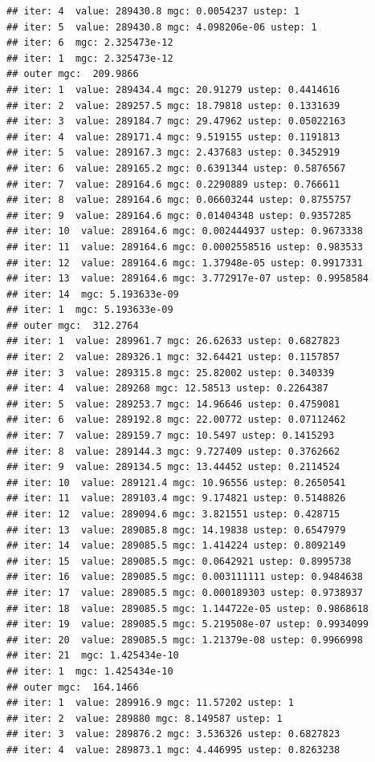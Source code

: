 \documentclass{article}\usepackage[]{graphicx}\usepackage[]{xcolor}
\makeatletter
\newenvironment{kframe}{%
 \def\at@end@of@kframe{}%
 \ifinner\ifhmode%
  \def\at@end@of@kframe{\end{minipage}}%
  \begin{minipage}{\columnwidth}%
 \fi\fi%
 \def\FrameCommand##1{\hskip\@totalleftmargin \hskip-\fboxsep
 \colorbox{shadecolor}{##1}\hskip-\fboxsep
     \hskip-\linewidth \hskip-\@totalleftmargin \hskip\columnwidth}%
 \MakeFramed {\advance\hsize-\width
   \@totalleftmargin\z@ \linewidth\hsize
   \@setminipage}}%
 {\par\unskip\endMakeFramed%
 \at@end@of@kframe}
\newenvironment{knitrout}{}{} %
\makeatother
\begin{document}
\begin{knitrout}
\begin{kframe}
\begin{verbatim}
## iter: 4  value: 289430.8 mgc: 0.0054237 ustep: 1 
## iter: 5  value: 289430.8 mgc: 4.098206e-06 ustep: 1 
## iter: 6  mgc: 2.325473e-12 
## iter: 1  mgc: 2.325473e-12 
## outer mgc:  209.9866 
## iter: 1  value: 289434.4 mgc: 20.91279 ustep: 0.4414616 
## iter: 2  value: 289257.5 mgc: 18.79818 ustep: 0.1331639 
## iter: 3  value: 289184.7 mgc: 29.47962 ustep: 0.05022163 
## iter: 4  value: 289171.4 mgc: 9.519155 ustep: 0.1191813 
## iter: 5  value: 289167.3 mgc: 2.437683 ustep: 0.3452919 
## iter: 6  value: 289165.2 mgc: 0.6391344 ustep: 0.5876567 
## iter: 7  value: 289164.6 mgc: 0.2290889 ustep: 0.766611 
## iter: 8  value: 289164.6 mgc: 0.06603244 ustep: 0.8755757 
## iter: 9  value: 289164.6 mgc: 0.01404348 ustep: 0.9357285 
## iter: 10  value: 289164.6 mgc: 0.002444937 ustep: 0.9673338 
## iter: 11  value: 289164.6 mgc: 0.0002558516 ustep: 0.983533 
## iter: 12  value: 289164.6 mgc: 1.37948e-05 ustep: 0.9917331 
## iter: 13  value: 289164.6 mgc: 3.772917e-07 ustep: 0.9958584 
## iter: 14  mgc: 5.193633e-09 
## iter: 1  mgc: 5.193633e-09 
## outer mgc:  312.2764 
## iter: 1  value: 289961.7 mgc: 26.62633 ustep: 0.6827823 
## iter: 2  value: 289326.1 mgc: 32.64421 ustep: 0.1157857 
## iter: 3  value: 289315.8 mgc: 25.82002 ustep: 0.340339 
## iter: 4  value: 289268 mgc: 12.58513 ustep: 0.2264387 
## iter: 5  value: 289253.7 mgc: 14.96646 ustep: 0.4759081 
## iter: 6  value: 289192.8 mgc: 22.00772 ustep: 0.07112462 
## iter: 7  value: 289159.7 mgc: 10.5497 ustep: 0.1415293 
## iter: 8  value: 289144.3 mgc: 9.727409 ustep: 0.3762662 
## iter: 9  value: 289134.5 mgc: 13.44452 ustep: 0.2114524 
## iter: 10  value: 289121.4 mgc: 10.96556 ustep: 0.2650541 
## iter: 11  value: 289103.4 mgc: 9.174821 ustep: 0.5148826 
## iter: 12  value: 289094.6 mgc: 3.821551 ustep: 0.428715 
## iter: 13  value: 289085.8 mgc: 14.19838 ustep: 0.6547979 
## iter: 14  value: 289085.5 mgc: 1.414224 ustep: 0.8092149 
## iter: 15  value: 289085.5 mgc: 0.0642921 ustep: 0.8995738 
## iter: 16  value: 289085.5 mgc: 0.003111111 ustep: 0.9484638 
## iter: 17  value: 289085.5 mgc: 0.000189303 ustep: 0.9738937 
## iter: 18  value: 289085.5 mgc: 1.144722e-05 ustep: 0.9868618 
## iter: 19  value: 289085.5 mgc: 5.219508e-07 ustep: 0.9934099 
## iter: 20  value: 289085.5 mgc: 1.21379e-08 ustep: 0.9966998 
## iter: 21  mgc: 1.425434e-10 
## iter: 1  mgc: 1.425434e-10 
## outer mgc:  164.1466 
## iter: 1  value: 289916.9 mgc: 11.57202 ustep: 1 
## iter: 2  value: 289880 mgc: 8.149587 ustep: 1 
## iter: 3  value: 289876.2 mgc: 3.536326 ustep: 0.6827823 
## iter: 4  value: 289873.1 mgc: 4.446995 ustep: 0.8263238 

\end{verbatim}
\end{kframe}
\end{knitrout}
\end{document}
